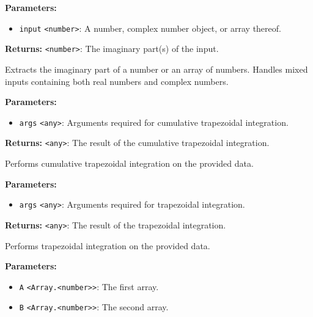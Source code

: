 \documentclass[12pt,a4paper]{article}
\begin{document}
\noindent \textbf{Parameters:}
\begin{itemize}
  \item \texttt{input} \texttt{<number>}: A number, complex number object, or array thereof.
\end{itemize}

\noindent \textbf{Returns:} \texttt{<number>}: The imaginary part(s) of the input.

\noindent Extracts the imaginary part of a number or an array of numbers.
Handles mixed inputs containing both real numbers and complex numbers.

\vspace{5mm}
\noindent {}


\noindent \textbf{Parameters:}
\begin{itemize}
  \item \texttt{args} \texttt{<any>}: Arguments required for cumulative trapezoidal integration.
\end{itemize}

\noindent \textbf{Returns:} \texttt{<any>}: The result of the cumulative trapezoidal integration.

\noindent Performs cumulative trapezoidal integration on the provided data.

\vspace{5mm}
\noindent {}


\noindent \textbf{Parameters:}
\begin{itemize}
  \item \texttt{args} \texttt{<any>}: Arguments required for trapezoidal integration.
\end{itemize}

\noindent \textbf{Returns:} \texttt{<any>}: The result of the trapezoidal integration.

\noindent Performs trapezoidal integration on the provided data.

\vspace{5mm}
\noindent {}


\noindent \textbf{Parameters:}
\begin{itemize}
  \item \texttt{A} \texttt{<Array.<number>>}: The first array.
  \item \texttt{B} \texttt{<Array.<number>>}: The second array.
\end{itemize}
\end{document}
